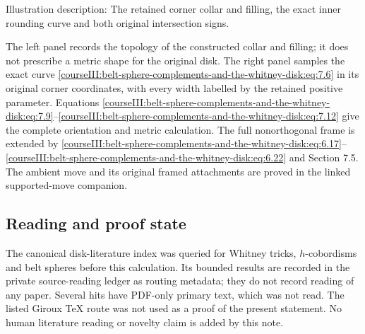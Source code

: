 \label{courseIII:belt-sphere-complements-and-the-whitney-disk:whitney-boundary-diagram}
Illustration description: The retained corner collar and filling, the exact inner rounding curve and both original intersection signs.

The left panel records the topology of the constructed collar and filling; it does not prescribe a metric shape for the original disk. The right panel samples the exact curve \eqref{courseIII:belt-sphere-complements-and-the-whitney-disk:eq:7.6} in its original corner coordinates, with every width labelled by the retained positive parameter. Equations \eqref{courseIII:belt-sphere-complements-and-the-whitney-disk:eq:7.9}--\eqref{courseIII:belt-sphere-complements-and-the-whitney-disk:eq:7.12} give the complete orientation and metric calculation. The full nonorthogonal frame is extended by \eqref{courseIII:belt-sphere-complements-and-the-whitney-disk:eq:6.17}--\eqref{courseIII:belt-sphere-complements-and-the-whitney-disk:eq:6.22} and Section 7.5. The ambient move and its original framed attachments are proved in the linked supported-move companion.

\subsection{Reading and proof state}
\label{courseIII:belt-sphere-complements-and-the-whitney-disk:belt-sources}

The canonical disk-literature index was queried for Whitney tricks, \(h\)-cobordisms and belt spheres before this calculation. Its bounded results are recorded in the private source-reading ledger as routing metadata; they do not record reading of any paper. Several hits have PDF-only primary text, which was not read. The listed Giroux TeX route was not used as a proof of the present statement. No human literature reading or novelty claim is added by this note.

